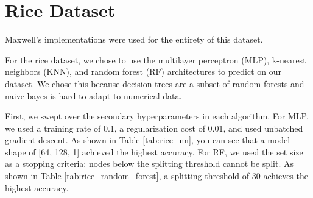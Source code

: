 \section{Rice Dataset}
Maxwell's implementations were used for the entirety of this dataset.

For the rice dataset, we chose to use the multilayer perceptron (MLP), k-nearest neighbors (KNN), and
random forest (RF) architectures to predict on our dataset.
We chose this because decision trees are a subset of random forests and naive bayes is hard to adapt
to numerical data.

First, we swept over the secondary hyperparameters in each algorithm.
For MLP, we used a training rate of 0.1, a regularization cost of 0.01, and used unbatched gradient
descent.
As shown in Table \ref{tab:rice_nn}, you can see that a model shape of [64, 128, 1] achieved the
highest accuracy.
For RF, we used the set size as a stopping criteria: nodes below the splitting threshold cannot be
split.
As shown in Table \ref{tab:rice_random_forest}, a splitting threshold of 30 achieves the highest
accuracy.

